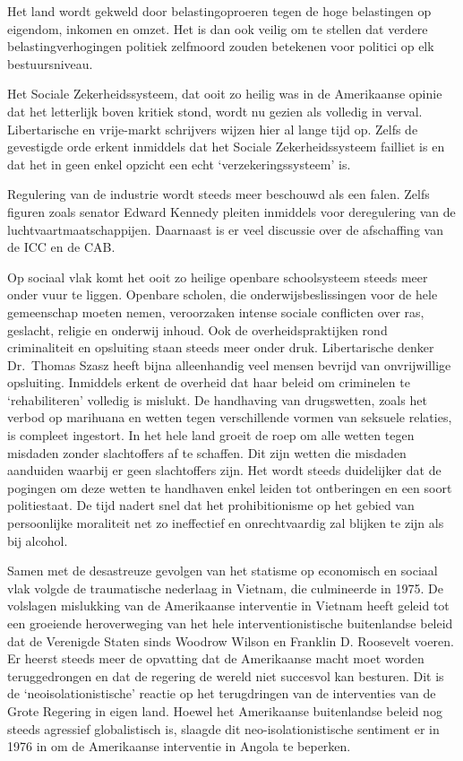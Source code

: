 \documentclass[
  a5paper,
  smalldemyvopaper,10pt,twoside,onecolumn,openright,extrafontsizes,hidelinks]{memoir}
\begin{document}
Het land wordt gekweld door belastingoproeren tegen de hoge belastingen
op eigendom, inkomen en omzet. Het is dan ook veilig om te stellen dat
verdere belastingverhogingen politiek zelfmoord zouden betekenen voor
politici op elk bestuursniveau.

Het Sociale Zekerheidssysteem, dat ooit zo heilig was in de Amerikaanse
opinie dat het letterlijk boven kritiek stond, wordt nu gezien als
volledig in verval. Libertarische en vrije-markt schrijvers wijzen hier
al lange tijd op. Zelfs de gevestigde orde erkent inmiddels dat het
Sociale Zekerheidssysteem failliet is en dat het in geen enkel opzicht
een echt `verzekeringssysteem' is.

Regulering van de industrie wordt steeds meer beschouwd als een falen.
Zelfs figuren zoals senator Edward Kennedy pleiten inmiddels voor
deregulering van de luchtvaartmaatschappijen. Daarnaast is er veel
discussie over de afschaffing van de ICC en de CAB.

Op sociaal vlak komt het ooit zo heilige openbare schoolsysteem steeds
meer onder vuur te liggen. Openbare scholen, die onderwijsbeslissingen
voor de hele gemeenschap moeten nemen, veroorzaken intense sociale
conflicten over ras, geslacht, religie en onderwij inhoud. Ook de
overheidspraktijken rond criminaliteit en opsluiting staan steeds meer
onder druk. Libertarische denker Dr.~Thomas Szasz heeft bijna
alleenhandig veel mensen bevrijd van onvrijwillige opsluiting. Inmiddels
erkent de overheid dat haar beleid om criminelen te `rehabiliteren'
volledig is mislukt. De handhaving van drugswetten, zoals het verbod op
marihuana en wetten tegen verschillende vormen van seksuele relaties, is
compleet ingestort. In het hele land groeit de roep om alle wetten tegen
misdaden zonder slachtoffers af te schaffen. Dit zijn wetten die
misdaden aanduiden waarbij er geen slachtoffers zijn. Het wordt steeds
duidelijker dat de pogingen om deze wetten te handhaven enkel leiden tot
ontberingen en een soort politiestaat. De tijd nadert snel dat het
prohibitionisme op het gebied van persoonlijke moraliteit net zo
ineffectief en onrechtvaardig zal blijken te zijn als bij alcohol.

Samen met de desastreuze gevolgen van het statisme op economisch en
sociaal vlak volgde de traumatische nederlaag in Vietnam, die
culmineerde in 1975. De volslagen mislukking van de Amerikaanse
interventie in Vietnam heeft geleid tot een groeiende heroverweging van
het hele interventionistische buitenlandse beleid dat de Verenigde
Staten sinds Woodrow Wilson en Franklin D. Roosevelt voeren. Er heerst
steeds meer de opvatting dat de Amerikaanse macht moet worden
teruggedrongen en dat de regering de wereld niet succesvol kan besturen.
Dit is de `neoisolationistische' reactie op het terugdringen van de
interventies van de Grote Regering in eigen land. Hoewel het Amerikaanse
buitenlandse beleid nog steeds agressief globalistisch is, slaagde dit
neo-isolationistische sentiment er in 1976 in om de Amerikaanse
interventie in Angola te beperken.
\end{document}
